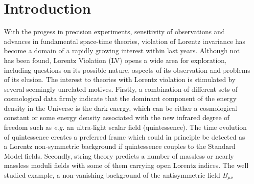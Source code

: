 \documentclass[12pt]{revtex4}
\begin{document}
\newpage

\setcounter{footnote}{0}
\setcounter{equation}{0}


\section{Introduction}
\label{Intro}

With the progess in precision experiments, sensitivity of observations
and advances in fundamental space-time theories,
violation of Lorentz invariance has become a domain of a rapidly growing interest within last
years. 
Although not has been found, Lorentz Violation (LV) opens a wide area 
for exploration, including
questions on its possible nature, aspects of its observation and problems
of its elusion.
The interest to 
theories with Lorentz violation is stimulated by several seemingly 
unrelated motives. Firstly, a combination of different sets of 
cosmological data firmly indicate that the dominant 
component of the energy density in the Universe is the dark energy, 
which can be either a cosmological constant or some energy density 
associated with the new infrared degree of freedom such as {\em e.g.} 
an ultra-light scalar field (quintessence). 
The time evolution of quintessence creates a preferred frame 
which could in principle be detected as a Lorentz non-symmetric background if 
quintessence couples to the Standard Model fields. 
Secondly, string theory predicts a number of massless or nearly massless 
moduli fields with some of them carrying open Lorentz indices. The well studied 
example, a non-vanishing background of the antisymmetric field $B_{\mu\nu}$
\end{document}
